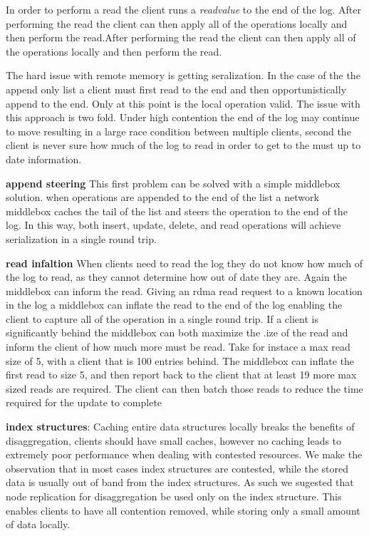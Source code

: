 In order to perform a read the client runs a
\textit{read{value}} to the end of the log. After performing
the read the client can then apply all of the operations
locally and then perform the read.After performing the read
the client can then apply all of the operations locally and
then perform the read.

The hard issue with remote memory is getting seralization.
In the case of the the append only list a client must first
read to the end and then opportunistically append to the
end. Only at this point is the local operation valid. The
issue with this approach is two fold. Under high contention
the end of the log may continue to move resulting in a large
race condition between multiple clients, second the client
is never sure how much of the log to read in order to get to
the must up to date information. 

\textbf{append steering} This first problem can be solved
with a simple middlebox solution.  when operations are
appended to the end of the list a network middlebox caches
the tail of the list and steers the operation to the end of
the log. In this way, both insert, update, delete, and read
operations will achieve serialization in a single round
trip. 

\textbf{read infaltion} When clients need to read the log
they do not know how much of the log to read, as they cannot
determine how out of date they are. Again the middlebox can
inform the read. Giving an rdma read request to a known
location in the log a middlebox can inflate the read to the
end of the log enabling the client to capture all of the
operation in a single round trip. If a client is
significantly behind the middlebox can both maximize the
.ize of the read and inform the client of how much more must
be read. Take for instace a max read size of 5, with a
client that is 100 entries behind. The middlebox can inflate
the first read to size 5, and then report back to the client
that at least 19 more max sized reads are required. The
client can then batch those reads to reduce the time
required for the update to complete

\textbf{index structures}: Caching entire data structures
locally breaks the benefits of disaggregation, clients
should have small caches, however no caching leads to
extremely poor performance when dealing with contested
resources. We make the observation that in most cases index
structures are contested, while the stored data is usually
out of band from the index structures. As such we sugested
that node replication for disaggregation be used only on the
index structure. This enables clients to have all contention
removed, while storing only a small amount of data locally.

